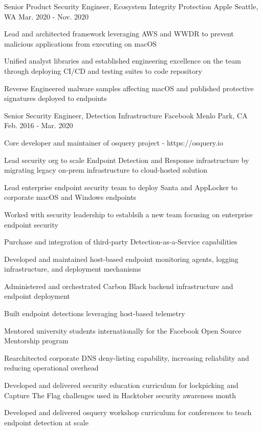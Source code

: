 \begin{cventries}

\cventry
{Senior Product Security Engineer, Ecosystem Integrity Protection} %
{Apple} %
{Seattle, WA} %
{Mar. 2020 - Nov. 2020} %
{ %
\begin{cvitems}
\item {Lead and architected framework leveraging AWS and WWDR to prevent malicious applications from executing on macOS}
\item {Unified analyst libraries and established engineering excellence on the team through deploying CI/CD and testing suites to code repository}
\item {Reverse Engineered malware samples affecting macOS and published protective signatures deployed to endpoints}
\end{cvitems}
}


\cventry
{Senior Security Engineer, Detection Infrastructure} %
{Facebook} %
{Menlo Park, CA} %
{Feb. 2016 - Mar. 2020} %
{ %
\begin{cvitems}
\item {Core developer and maintainer of osquery project - https://osquery.io}
\item {Lead security org to scale Endpoint Detection and Response infrastructure by migrating legacy on-prem infrastructure to cloud-hosted solution}
\item {Lead enterprise endpoint security team to deploy Santa and AppLocker to corporate macOS and Windows endpoints}
\item {Worked with security leadership to establsih a new team focusing on enterprise endpoint security}
\item {Purchase and integration of third-party Detection-as-a-Service capabilities}
\item {Developed and maintained host-based endpoint monitoring agents, logging infrastructure, and deployment mechanisms}
\item {Administered and orchestrated Carbon Black backend infrastructure and endpoint deployment}
\item {Built endpoint detections leveraging host-based telemetry}
\item {Mentored university students internationally for the Facebook Open Source Mentorship program}
\item {Rearchitected corporate DNS deny-listing capability, increasing reliability and reducing operational overhead}
\item {Developed and delivered security education curriculum for lockpicking and Capture The Flag challenges used in Hacktober security awareness month}
\item {Developed and delivered osquery workshop curriculum for conferences to teach endpoint detection at scale}
\end{cvitems}
}


\end{cventries}
